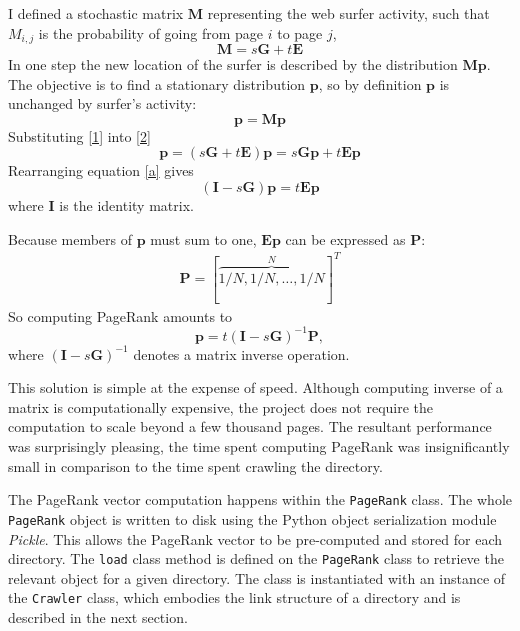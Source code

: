 \documentclass[12pt,a4paper,notitlepage,twoside]{scrbook}
\begin{document}
I defined a stochastic matrix \(\bm{M}\) representing the web surfer activity, such
that \(M_{i,j}\) is the probability of going from page \(i\) to page \(j\), 
\begin{equation} \label{1}
	\bm{M} = s \bm{G} +t \bm{E}
\end{equation}
In one step the new location of the surfer is described by the distribution \(\bm{Mp}\).
The objective is to find a stationary distribution \(\bm{p}\), so by definition \(\bm{p}\) is unchanged by
surfer's activity:
\begin{equation}\label{2}
	\bm{p} = \bm{M}\bm{p}
\end{equation}
Substituting \ref{1} into \ref{2}
\begin{equation} \label{a}
	\bm{p} = (s\bm{G}+t\bm{E})\bm{p} = s\bm{G} \bm{p} + t\bm{E} \bm{p}
\end{equation}
Rearranging equation \ref{a} gives
\begin{equation}
	(\bm{I}-s\bm{G})\bm{p} = t\bm{E} \bm{p}
\end{equation}
where \(\bm{I}\) is the identity matrix.

Because members of \(\bm{p}\) must sum to one, \(\bm{E} \bm{p}\) can be expressed as \(\bm{P}\):
\begin{gather*}
	\bm{P} = [\overbrace{1/N,1/N,\dots,1/N}^N]^T
\end{gather*}
So computing PageRank amounts to
\begin{equation}
	\bm{p}  = t(\bm{I}-s\bm{G})^{-1}\bm{P},
\end{equation}
where \((\bm{I}-s\bm{G})^{-1}\) denotes a matrix inverse operation.

This solution is simple at the expense of speed. Although computing inverse of a matrix is
computationally expensive, the project does not require the computation to scale beyond a
few thousand pages. The resultant performance was surprisingly pleasing, the time
spent computing PageRank was insignificantly small in comparison to the time spent
crawling the directory.

The PageRank vector computation happens within the \texttt{PageRank} class. The
whole \texttt{PageRank} object is written to disk using the Python object
serialization module \textit{Pickle}. This allows the PageRank vector to be pre-computed
and stored for each directory. The \texttt{load} class method is defined
on the \texttt{PageRank} class to retrieve the relevant object for a given
directory. The class is instantiated with an instance of the \texttt{Crawler}
class, which embodies the link structure of a directory and is described in the
next section.
\end{document}
